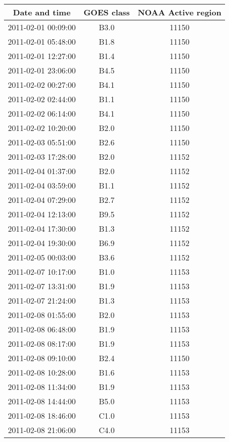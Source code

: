 \documentclass{article}
\begin{document}
\begin{table}
	\centering
		\begin{tabular}{c|c|c}
			Date and time & GOES class & NOAA Active region \\
			\hline
			2011-02-01 00:09:00 & B3.0 & 11150 \\ 
			2011-02-01 05:48:00 & B1.8 & 11150 \\ 
			2011-02-01 12:27:00 & B1.4 & 11150 \\ 
			2011-02-01 23:06:00 & B4.5 & 11150 \\ 
			2011-02-02 00:27:00 & B4.1 & 11150 \\ 
			2011-02-02 02:44:00 & B1.1 & 11150 \\ 
			2011-02-02 06:14:00 & B4.1 & 11150 \\ 
			2011-02-02 10:20:00 & B2.0 & 11150 \\ 
			2011-02-03 05:51:00 & B2.6 & 11150 \\ 
			2011-02-03 17:28:00 & B2.0 & 11152 \\ 
			2011-02-04 01:37:00 & B2.0 & 11152 \\ 
			2011-02-04 03:59:00 & B1.1 & 11152 \\ 
			2011-02-04 07:29:00 & B2.7 & 11152 \\ 
			2011-02-04 12:13:00 & B9.5 & 11152 \\ 
			2011-02-04 17:30:00 & B1.3 & 11152 \\ 
			2011-02-04 19:30:00 & B6.9 & 11152 \\ 
			2011-02-05 00:03:00 & B3.6 & 11152 \\ 
			2011-02-07 10:17:00 & B1.0 & 11153 \\ 
			2011-02-07 13:31:00 & B1.9 & 11153 \\ 
			2011-02-07 21:24:00 & B1.3 & 11153 \\ 
			2011-02-08 01:55:00 & B2.0 & 11153 \\ 
			2011-02-08 06:48:00 & B1.9 & 11153 \\ 
			2011-02-08 08:17:00 & B1.9 & 11153 \\ 
			2011-02-08 09:10:00 & B2.4 & 11150 \\ 
			2011-02-08 10:28:00 & B1.6 & 11153 \\ 
			2011-02-08 11:34:00 & B1.9 & 11153 \\ 
			2011-02-08 14:44:00 & B5.0 & 11153 \\ 
			2011-02-08 18:46:00 & C1.0 & 11153 \\ 
			2011-02-08 21:06:00 & C4.0 & 11153 \\ 

\end{tabular}
\end{table}
\end{document}
